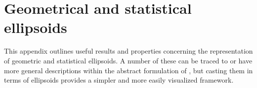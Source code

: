 \documentclass[11pt]{article}%
\begin{document}

\appendix
{}
\section{Geometrical and statistical ellipsoids}
This appendix outlines useful results and properties concerning the representation of geometric and statistical ellipsoids.
A number of these can be traced to or have more general descriptions within the abstract formulation of 
\citet{Dempster:69},
but casting them in terms of ellipsoids provides a simpler and more easily visualized framework. 




\end{document}
